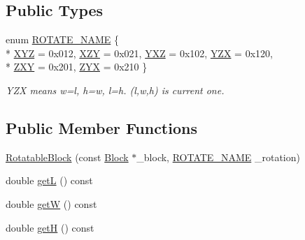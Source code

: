 \subsection*{Public Types}
\begin{DoxyCompactItemize}
\item 
enum \hyperlink{structRotatableBlock_ac076f0b2a72673cd4a5da5ea53b2e465}{R\+O\+T\+A\+T\+E\+\_\+\+N\+A\+M\+E} \{ \\*
\hyperlink{structRotatableBlock_ac076f0b2a72673cd4a5da5ea53b2e465a4e5874dc7e7f4a793efd2b3abecb34c9}{X\+Y\+Z} = 0x012, 
\hyperlink{structRotatableBlock_ac076f0b2a72673cd4a5da5ea53b2e465a8accfa9f236c3d421cf1863035093346}{X\+Z\+Y} = 0x021, 
\hyperlink{structRotatableBlock_ac076f0b2a72673cd4a5da5ea53b2e465ad22b8f1162e159ff4a3137db9c1e34d0}{Y\+X\+Z} = 0x102, 
\hyperlink{structRotatableBlock_ac076f0b2a72673cd4a5da5ea53b2e465a930b4b7cd8e1df5745dc7a6a4bf2355e}{Y\+Z\+X} = 0x120, 
\\*
\hyperlink{structRotatableBlock_ac076f0b2a72673cd4a5da5ea53b2e465a0cd2dbb032ea58008adafa343d3e8111}{Z\+X\+Y} = 0x201, 
\hyperlink{structRotatableBlock_ac076f0b2a72673cd4a5da5ea53b2e465abae8fc51a17af85462aa1e971e379c17}{Z\+Y\+X} = 0x210
 \}
\begin{DoxyCompactList}\small\item\em Y\+Z\+X means w\textquotesingle{}=l, h\textquotesingle{}=w, l\textquotesingle{}=h. (l\textquotesingle{},w\textquotesingle{},h\textquotesingle{}) is current one. \end{DoxyCompactList}\end{DoxyCompactItemize}
\subsection*{Public Member Functions}
\begin{DoxyCompactItemize}
\item 
\hyperlink{structRotatableBlock_ac9c0dd6af399b054a0011332b0b7fa77}{Rotatable\+Block} (const \hyperlink{structBlock}{Block} $\ast$\+\_\+block, \hyperlink{structRotatableBlock_ac076f0b2a72673cd4a5da5ea53b2e465}{R\+O\+T\+A\+T\+E\+\_\+\+N\+A\+M\+E} \+\_\+rotation)
\item 
double \hyperlink{structRotatableBlock_a0ed9c1f491d20ef51f1a655bf9ebbb2f}{get\+L} () const 
\item 
double \hyperlink{structRotatableBlock_a7516433d41793095435f3e99ef88edae}{get\+W} () const 
\item 
double \hyperlink{structRotatableBlock_ac4f1a519af134049d68d9ee103c2aa89}{get\+H} () const 
\end{DoxyCompactItemize}
